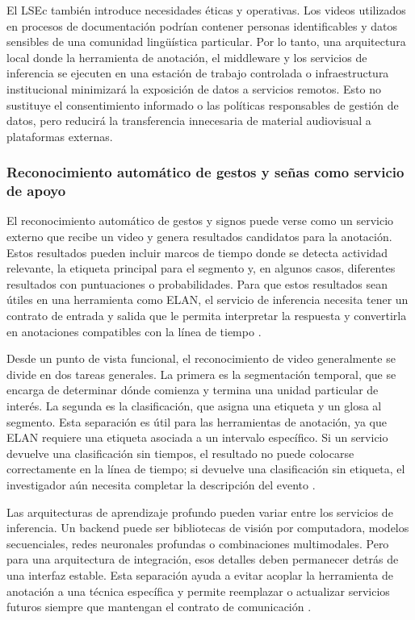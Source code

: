 El LSEc también introduce necesidades éticas y operativas. Los videos utilizados en procesos de documentación podrían contener personas identificables y datos sensibles de una comunidad lingüística particular. Por lo tanto, una arquitectura local donde la herramienta de anotación, el middleware y los servicios de inferencia se ejecuten en una estación de trabajo controlada o infraestructura institucional minimizará la exposición de datos a servicios remotos. Esto no sustituye el consentimiento informado o las políticas responsables de gestión de datos, pero reducirá la transferencia innecesaria de material audiovisual a plataformas externas\cite{shi2016edge}.

\subsubsection{Reconocimiento automático de gestos y señas como servicio de apoyo}

El reconocimiento automático de gestos y signos puede verse como un servicio externo que recibe un video y genera resultados candidatos para la anotación. Estos resultados pueden incluir marcos de tiempo donde se detecta actividad relevante, la etiqueta principal para el segmento y, en algunos casos, diferentes resultados con puntuaciones o probabilidades. Para que estos resultados sean útiles en una herramienta como ELAN, el servicio de inferencia necesita tener un contrato de entrada y salida que le permita interpretar la respuesta y convertirla en anotaciones compatibles con la línea de tiempo \cite{auer2014avatech}.

Desde un punto de vista funcional, el reconocimiento de video generalmente se divide en dos tareas generales. La primera es la segmentación temporal, que se encarga de determinar dónde comienza y termina una unidad particular de interés. La segunda es la clasificación, que asigna una etiqueta y un glosa al segmento. Esta separación es útil para las herramientas de anotación, ya que ELAN requiere una etiqueta asociada a un intervalo específico. Si un servicio devuelve una clasificación sin tiempos, el resultado no puede colocarse correctamente en la línea de tiempo; si devuelve una clasificación sin etiqueta, el investigador aún necesita completar la descripción del evento \cite{guevara2022lsec_interprete,cruz2025prototipo}.

Las arquitecturas de aprendizaje profundo pueden variar entre los servicios de inferencia. Un backend puede ser bibliotecas de visión por computadora, modelos secuenciales, redes neuronales profundas o combinaciones multimodales. Pero para una arquitectura de integración, esos detalles deben permanecer detrás de una interfaz estable. Esta separación ayuda a evitar acoplar la herramienta de anotación a una técnica específica y permite reemplazar o actualizar servicios futuros siempre que mantengan el contrato de comunicación \cite{fielding2000rest}.


